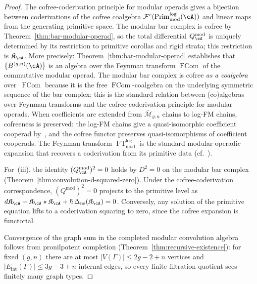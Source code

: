 \begin{proof}
The cofree-coderivation principle for modular operads gives a
bijection between coderivations of the cofree coalgebra
$\mathcal{F}^c(\operatorname{Prim}^{\log}_{\mathrm{mod}}(\cA))$
and linear maps from the generating primitive space.  The modular
bar complex is cofree by
Theorem~\ref{thm:bar-modular-operad}, so the total differential
$Q_\cA^{\mathrm{mod}}$ is uniquely determined by its restriction to
primitive corollas and rigid strata; this restriction is
$\mathfrak{K}_\cA$.  More precisely:
Theorem~\ref{thm:bar-modular-operad} establishes that
$\{B^{(g,n)}(\cA)\}$ is an algebra over the Feynman transform
$\operatorname{FCom}$ of the commutative modular operad.
The modular bar complex is cofree \emph{as a coalgebra}
over~$\operatorname{FCom}$ because it is the free
$\operatorname{FCom}$-coalgebra on the underlying symmetric
sequence of the bar complex; this is the standard relation
between (co)algebras over Feynman transforms and the
cofree-coderivation principle for modular operads.
When coefficients are extended from $\overline{\mathcal{M}}_{g,n}$
chains to log-FM chains, cofreeness is preserved: the log-FM
chains give a quasi-isomorphic coefficient cooperad
by~\cite[Theorem~3.3.1]{Mok25}, and the cofree functor preserves
quasi-isomorphisms of coefficient cooperads.
The Feynman transform
$\operatorname{FT}^{\log}_{\mathrm{mod}}$ is the standard
modular-operadic expansion that recovers a coderivation from its
primitive data (cf.~\cite[\S5.8]{LV12}).

For~(iii), the identity $(Q_\cA^{\mathrm{mod}})^2 = 0$ holds by
$D^2 = 0$ on the modular bar complex
(Theorem~\ref{thm:convolution-d-squared-zero}).  Under the
cofree-coderivation correspondence, $(Q^{\mathrm{mod}})^2 = 0$
projects to the primitive level as
$d\mathfrak{K}_\cA + \mathfrak{K}_\cA \star \mathfrak{K}_\cA
+ \hbar\,\Delta_{\mathrm{ns}}(\mathfrak{K}_\cA) = 0$.
Conversely, any solution of the primitive equation lifts to a
coderivation squaring to zero, since the cofree expansion is
functorial.

Convergence of the graph sum in the completed modular convolution
algebra follows from pronilpotent completion
(Theorem~\ref{thm:recursive-existence}): for fixed $(g,n)$
there are at most $|V(\Gamma)| \leq 2g-2+n$ vertices and
$|E_{\mathrm{int}}(\Gamma)| \leq 3g-3+n$ internal edges,
so every finite filtration quotient sees finitely many graph types.
\end{proof}

